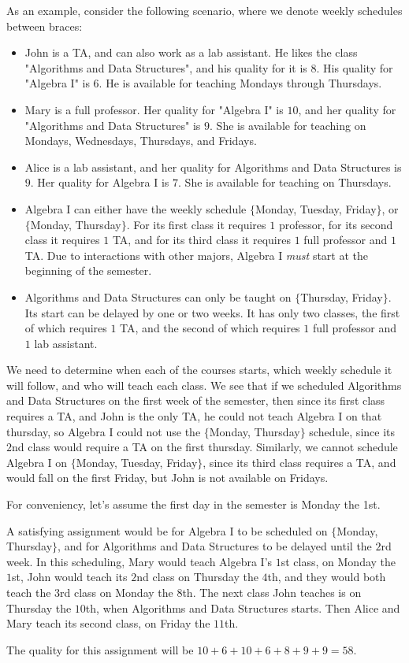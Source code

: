 As an example, consider the following scenario, where we denote weekly schedules between braces:
\begin{itemize}
\item John is a TA, and can also work as a lab assistant. He likes the class "Algorithms and Data Structures", and his quality for it is $8$. His quality for "Algebra I" is $6$. He is available for teaching Mondays through Thursdays.
\item Mary is a full professor. Her quality for "Algebra I" is $10$, and her quality for "Algorithms and Data Structures" is $9$. She is available for teaching on Mondays, Wednesdays, Thursdays, and Fridays.
\item Alice is a lab assistant, and her quality for Algorithms and Data Structures is $9$. Her quality for Algebra I is $7$. She is available for teaching on Thursdays.
\item Algebra I can either have the weekly schedule $\{$Monday, Tuesday, Friday$\}$, or $\{$Monday, Thursday$\}$. For its first class it requires $1$ professor, for its second class it requires $1$ TA, and for its third class it requires $1$ full professor and $1$ TA. Due to interactions with other majors, Algebra I \emph{must} start at the beginning of the semester.
\item Algorithms and Data Structures can only be taught on $\{$Thursday, Friday$\}$. Its start can be delayed by one or two weeks. It has only two classes, the first of which requires $1$ TA, and the second of which requires $1$ full professor and $1$ lab assistant.
\end{itemize}

We need to determine when each of the courses starts, which weekly schedule it will follow, and who will teach each class. We see that if we scheduled Algorithms and Data Structures on the first week of the semester, then since its first class requires a TA, and John is the only TA, he could not teach Algebra I on that thursday, so Algebra I could not use the $\{$Monday, Thursday$\}$ schedule, since its $2$nd class would require a TA on the first thursday. Similarly, we cannot schedule Algebra I on $\{$Monday, Tuesday, Friday$\}$, since its third class requires a TA, and would fall on the first Friday, but John is not available on Fridays.

For conveniency, let's assume the first day in the semester is Monday the 1st.

A satisfying assignment would be for Algebra I to be scheduled on $\{$Monday, Thursday$\}$, and for Algorithms and Data Structures to be delayed until the $2$rd week. In this scheduling, Mary would teach Algebra I's $1$st class, on Monday the $1$st, John would teach its $2$nd class on Thursday the $4$th, and they would both teach the $3$rd class on Monday the $8$th. The next class John teaches is on Thursday the $10$th, when Algorithms and Data Structures starts. Then Alice and Mary teach its second class, on Friday the $11$th.

The quality for this assignment will be $10 + 6 + 10 + 6 + 8 + 9 + 9 = 58$.

